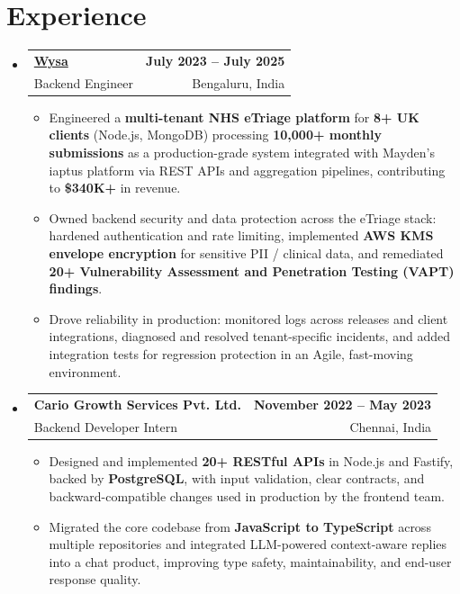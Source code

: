 \documentclass[letterpaper,10pt]{article}
\makeatletter
\newcommand{\resumeItem}[1]{
  \item\small{#1\vspace{-1pt}}
}
\newcommand{\resumeSubheading}[4]{
  \vspace{1pt}\item
    \begin{tabular*}{0.985\textwidth}[t]{l@{\extracolsep{\fill}}r}
      \textbf{#1} & \textbf{\small #2} \\
      {\small\color{ResumeSlate} #3} & {\small\color{ResumeSlate} #4} \\
    \end{tabular*}\vspace{-6pt}
}
\newcommand{\resumeSubHeadingListStart}{\begin{itemize}[leftmargin=0.0in, label={}, itemsep=2pt, topsep=2pt]}
\newcommand{\resumeSubHeadingListEnd}{\end{itemize}}
\newcommand{\resumeItemListStart}{\begin{itemize}[leftmargin=0.18in, itemsep=2pt, topsep=1pt]}
\newcommand{\resumeItemListEnd}{\end{itemize}\vspace{-4pt}}
\makeatother
\begin{document}
\section{Experience}
\resumeSubHeadingListStart
  \resumeSubheading
    {\href{https://www.wysa.io}{Wysa}}{July 2023 -- July 2025}
    {Backend Engineer}{Bengaluru, India}
    \resumeItemListStart
      \resumeItem{Engineered a \textbf{multi-tenant NHS eTriage platform} for \textbf{8+ UK clients} (Node.js, MongoDB) processing \textbf{10{,}000+ monthly submissions} as a production-grade system integrated with Mayden's iaptus platform via REST APIs and aggregation pipelines, contributing to \textbf{\$340K+} in revenue.}
      \resumeItem{Owned backend security and data protection across the eTriage stack: hardened authentication and rate limiting, implemented \textbf{AWS KMS envelope encryption} for sensitive PII / clinical data, and remediated \textbf{20+ Vulnerability Assessment and Penetration Testing (VAPT) findings}.}
      \resumeItem{Drove reliability in production: monitored logs across releases and client integrations, diagnosed and resolved tenant-specific incidents, and added integration tests for regression protection in an Agile, fast-moving environment.}
    \resumeItemListEnd
  \resumeSubheading
    {Cario Growth Services Pvt. Ltd.}{November 2022 -- May 2023}
    {Backend Developer Intern}{Chennai, India}
    \resumeItemListStart
      \resumeItem{Designed and implemented \textbf{20+ RESTful APIs} in Node.js and Fastify, backed by \textbf{PostgreSQL}, with input validation, clear contracts, and backward-compatible changes used in production by the frontend team.}
      \resumeItem{Migrated the core codebase from \textbf{JavaScript to TypeScript} across multiple repositories and integrated LLM-powered context-aware replies into a chat product, improving type safety, maintainability, and end-user response quality.}
    \resumeItemListEnd
\resumeSubHeadingListEnd
\vspace{-4pt}
\end{document}
